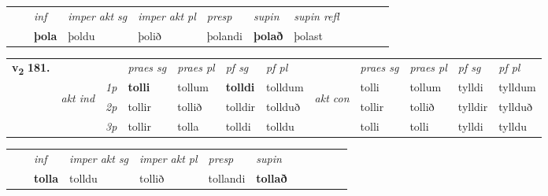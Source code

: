 \begin{tabular}{llllllllllll}
 & & \textit{inf} & \textit{imper akt sg} & \textit{imper akt pl}   & \textit{presp} & \textit{supin} & \textit{supin refl}      \\*
  & & \textbf{þola} & þoldu  & þolið   & þolandi &  \textbf{þolað} & þolast  \\*
\cmidrule{1-12}
\end{tabular}



\begin{tabular}{llllllllllll} \toprule
\multirow{4}{*}{{{\textbf{v{\textsubscript{2}}} \Large{\textbf{181.}}}}}  & &   &  \textit{praes sg}  & \textit{praes pl}  &\textit{ pf sg} & \textit{pf pl} &  &  \textit{praes sg}  & \textit{praes pl}  & \textit{pf sg} & \textit{pf pl } \\*
	\cmidrule{4-7} \cmidrule{9-12}
 & \multirow{3}{*}{\begin{turn}{90}\textit{akt ind}\end{turn}} & {\textit{1p}} & \textbf{tolli} & tollum    & \textbf{tolldi} & tolldum & \multirow{3}{*}{\begin{turn}{90}\textit{akt con}\end{turn}} &tolli & tollum & tylldi & tylldum\\*
& &  {\textit{2p}} &  tollir  & tollið   & tolldir & tollduð & & tollir & tollið & tylldir & tyllduð \\*
& &  {\textit{3p}} & tollir & tolla   & tolldi & tolldu & & tolli & tolli& tylldi & tylldu  \\*
\cmidrule{4-7} \cmidrule{9-12}
\end{tabular}


\begin{tabular}{llllllllllll}
 & & \textit{inf} & \textit{imper akt sg} & \textit{imper akt pl}   & \textit{presp} & \textit{supin}       \\*
  & & \textbf{tolla} & tolldu  & tollið   & tollandi &  \textbf{tollað}   \\*
\cmidrule{1-12}
\end{tabular}



